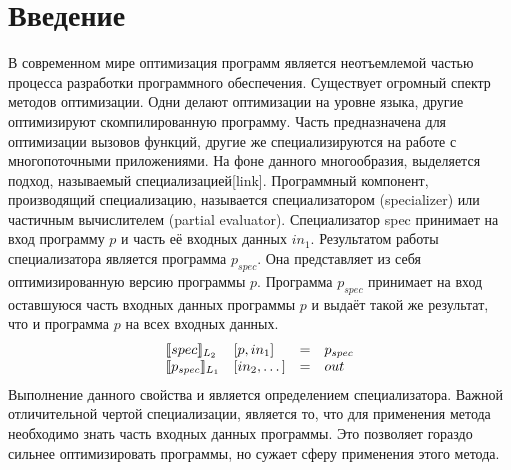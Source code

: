 \documentclass{spbau-diploma}
\begin{document}
\maketitle
\tableofcontents
\section*{Введение}
В современном мире оптимизация программ является неотъемлемой частью процесса разработки программного обеспечения. Существует огромный спектр методов оптимизации. Одни делают оптимизации на уровне языка, другие оптимизируют скомпилированную программу. Часть предназначена для оптимизации вызовов функций, другие же специализируются на работе с многопоточными приложениями. На фоне данного многообразия, выделяется подход, называемый специализацией[link]. Программный компонент, производящий специализацию, называется специализатором (specializer) или частичным вычислителем (partial evaluator). Специализатор spec принимает на вход программу $p$ и часть её входных данных $in_1$. Результатом работы специализатора является программа $p_{spec}$. Она представляет из себя оптимизированную версию программы $p$. Программа $p_{spec}$ принимает на вход оставшуюся часть входных данных программы $p$ и выдаёт такой же результат, что и программа $p$ на всех входных данных. 
$$\begin{array}{l l c l}
        \llbracket spec \rrbracket_{L_2} & [p, in_1] &= &p_{spec}\\
        \llbracket p_{spec} \rrbracket_{L_1} & [in_2 ,\dots] &= &out
      \end{array}$$
Выполнение данного свойства и является определением специализатора. Важной отличительной чертой специализации, является то, что для применения метода необходимо знать часть входных данных программы. Это позволяет гораздо сильнее оптимизировать программы, но сужает сферу применения этого метода.
\end{document}
